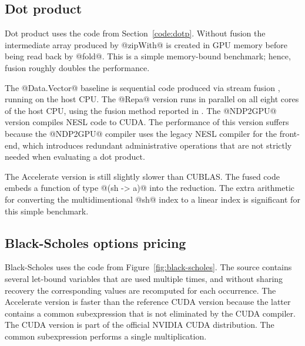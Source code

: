 \subsection{Dot product}
Dot product uses the code from Section~\ref{code:dotp}. Without fusion the intermediate array produced by @zipWith@ is created in GPU memory before being read back by @fold@. This is a simple memory-bound benchmark; hence, fusion roughly doubles the performance.

The @Data.Vector@ baseline is sequential code produced via stream fusion \cite{Coutts:stream-fusion}, running on the host CPU. The @Repa@ version runs in parallel on all eight cores of the host CPU, using the fusion method reported in \cite{Keller:Repa}. The @NDP2GPU@ version \cite{bergstrom:ndp2gpu} compiles NESL code \cite{Blelloch:nesl1995} to CUDA. The performance of this version suffers because the @NDP2GPU@ compiler uses the legacy NESL compiler for the front-end, which introduces redundant administrative operations that are not strictly needed when evaluating a dot product. 


The Accelerate version is still slightly slower than CUBLAS. The fused code embeds a function of type @(sh -> a)@ into the reduction. The extra arithmetic for converting the multidimentional @sh@ index to a linear index is significant for this simple benchmark. 



\subsection{Black-Scholes options pricing}
Black-Scholes uses the code from Figure~\ref{fig:black-scholes}. The source contains several let-bound variables that are used multiple times, and without sharing recovery the corresponding values are recomputed for each occurrence. The Accelerate version is faster than the reference CUDA version because the latter contains a common subexpression that is not eliminated by the CUDA compiler. The CUDA version is part of the official NVIDIA CUDA distribution. The common subexpression performs a single multiplication.


